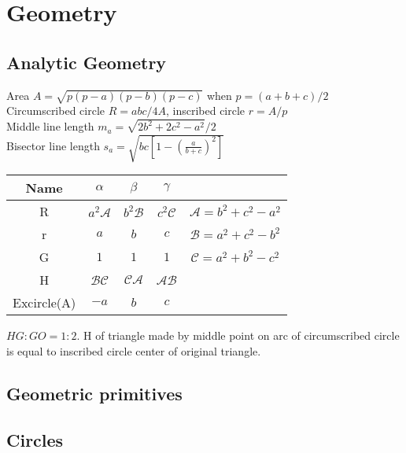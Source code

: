 \chapter{Geometry}

\section{Analytic Geometry}
Area $A = \sqrt{p(p-a)(p-b)(p-c)}$ when $p = (a+b+c)/2$ \\
Circumscribed circle $R = abc/4A$, inscribed circle $r = A/p$ \\ 
Middle line length $m_a = \sqrt{2b^2+2c^2-a^2}/2$ \\
Bisector line length $s_a=\sqrt{bc[1-(\frac{a}{b+c})^2]}$ \\
\begin{tabular}{|c|c|c|c|c|}
  Name & $\alpha$ & $\beta$ & $\gamma$ & \\ \hline
  R & $a^2\mathcal{A}$ & $b^2\mathcal{B}$ & $c^2\mathcal{C}$ & $\mathcal{A}=b^2+c^2-a^2$ \\
  r & $a$ & $b$ & $c$ & $\mathcal{B} = a^2 + c^2 - b^2$ \\
  G & $1$ & $1$ & $1$ & $\mathcal{C} = a^2 + b^2 - c^2$ \\
  H & $\mathcal{BC}$ & $\mathcal{CA}$ & $\mathcal{AB}$ & \\
  Excircle(A) & $-a$ & $b$ & $c$ & 
\end{tabular}
$HG:GO=1:2$. H of triangle made by middle point on arc of circumscribed circle is equal to inscribed circle center of original triangle. \\

\section{Geometric primitives}

\section{Circles}

